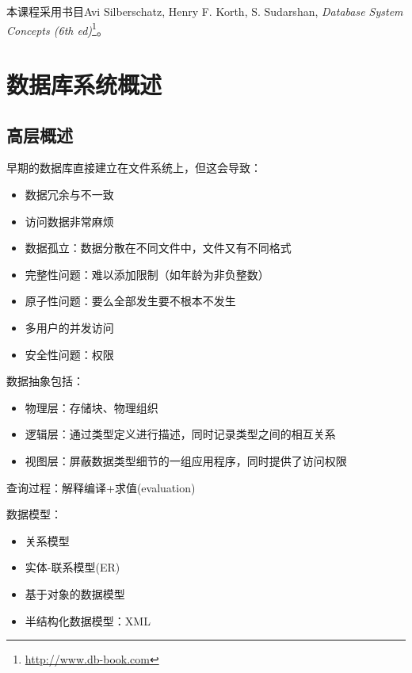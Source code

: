 
本课程采用书目Avi Silberschatz, Henry F. Korth, S. Sudarshan, \emph{Database System Concepts (6th ed)}\footnote{\url{http://www.db-book.com}}。

\section{数据库系统概述} %
\subsection{高层概述}
早期的数据库直接建立在文件系统上，但这会导致：
\begin{itemize}
	\item 数据冗余与不一致
	\item 访问数据非常麻烦
	\item 数据孤立：数据分散在不同文件中，文件又有不同格式
	\item 完整性问题：难以添加限制（如年龄为非负整数）
	\item 原子性问题：要么全部发生要不根本不发生
	\item 多用户的并发访问
	\item 安全性问题：权限
\end{itemize}

数据抽象包括：
\begin{itemize}
	\item 物理层：存储块、物理组织
	\item 逻辑层：通过类型定义进行描述，同时记录类型之间的相互关系
	\item 视图层：屏蔽数据类型细节的一组应用程序，同时提供了访问权限
\end{itemize}

查询过程：解释编译+求值(evaluation)

数据模型：
\begin{itemize}
	\item 关系模型
	\item 实体-联系模型(ER)
	\item 基于对象的数据模型
	\item 半结构化数据模型：XML
\end{itemize}

